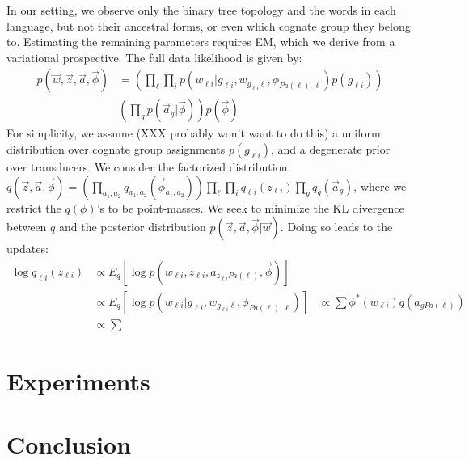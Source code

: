\documentclass[11pt]{article}
\begin{document}
In our setting, we observe only the binary tree topology and the words in each language, but not their ancestral forms, or even which cognate group they belong to. Estimating
the remaining parameters requires EM, which we derive from a variational prospective. The full data likelihood is given by:
\begin{equation}
  \begin{split}
    p(\vec w, \vec z, \vec a, \vec \phi) &= (\prod_\ell \prod_i p(w_{\ell i}|g_{\ell i},w_{g_{\ell i}\ell},\phi_{Pa(\ell),\ell})p(g_{\ell i}))\\
      & (\prod_g p(\vec a_g|\vec\phi) ) p(\vec \phi)
   \end{split}
 \end{equation}
 For simplicity, we assume (XXX probably won't want to do this) a uniform distribution over cognate group assignments $p(g_{\ell i })$, and a degenerate prior over
 transducers.
 We consider the factorized distribution $q(\vec z, \vec a, \vec \phi) = (\prod_{a_1,a_2} q_{a_1,a_2}(\vec \phi_{a_1,a_2}))\prod_\ell \prod_i q_{\ell i}(z_{\ell i})\prod_g
 q_g(\vec a_g)$, where we restrict the $q(\phi)$'s to be point-masses. We seek to minimize the KL divergence between $q$ and the posterior distribution $p(\vec z, \vec a, \vec \phi| \vec w)$.  Doing so leads to the
 updates:
 \begin{equation}
   \begin{split}
     \log q_{\ell i}(z_{\ell i}) &\propto E_q[\log p(w_{\ell i}, z_{\ell i}, a_{z_{\ell i} Pa(\ell)},\vec \phi)] \\
     &\propto E_q[\log  p(w_{\ell i}|g_{\ell i},w_{g_{\ell i}\ell},\phi_{Pa(\ell),\ell}) ]
     &\propto \sum \phi^*(w_{\ell i}) q(a_{gPa(\ell)}) \\
     &\propto \sum 
    \end{split}
  \end{equation}
\section{Experiments}
\section{Conclusion}
\end{document}
